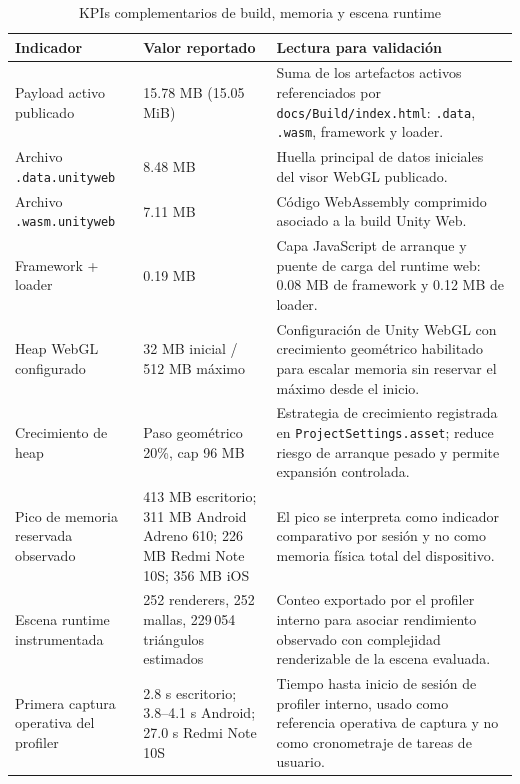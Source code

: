 \begin{table}[H]
    \caption{KPIs complementarios de build, memoria y escena runtime}
    \label{tab:kpis_complementarios_build_memoria}
    \centering
    \scriptsize
    \singlespacing
    \renewcommand{\arraystretch}{1.08}
    \setlength{\tabcolsep}{3pt}
    \begin{tabular}{p{3.8cm}p{3.2cm}p{7.0cm}}
        \hline
        \textbf{Indicador} & \textbf{Valor reportado} & \textbf{Lectura para validación} \\ \hline
        Payload activo publicado & 15.78 MB (15.05 MiB) & Suma de los artefactos activos referenciados por \texttt{docs/Build/index.html}: \texttt{.data}, \texttt{.wasm}, framework y loader. \\
        Archivo \texttt{.data.unityweb} & 8.48 MB & Huella principal de datos iniciales del visor WebGL publicado. \\
        Archivo \texttt{.wasm.unityweb} & 7.11 MB & Código WebAssembly comprimido asociado a la build Unity Web. \\
        Framework + loader & 0.19 MB & Capa JavaScript de arranque y puente de carga del runtime web: 0.08 MB de framework y 0.12 MB de loader. \\
        Heap WebGL configurado & 32 MB inicial / 512 MB máximo & Configuración de Unity WebGL con crecimiento geométrico habilitado para escalar memoria sin reservar el máximo desde el inicio. \\
        Crecimiento de heap & Paso geométrico 20\%, cap 96 MB & Estrategia de crecimiento registrada en \texttt{ProjectSettings.asset}; reduce riesgo de arranque pesado y permite expansión controlada. \\
        Pico de memoria reservada observado & 413 MB escritorio; 311 MB Android Adreno 610; 226 MB Redmi Note 10S; 356 MB iOS & El pico se interpreta como indicador comparativo por sesión y no como memoria física total del dispositivo. \\
        Escena runtime instrumentada & 252 renderers, 252 mallas, 229\,054 triángulos estimados & Conteo exportado por el profiler interno para asociar rendimiento observado con complejidad renderizable de la escena evaluada. \\
        Primera captura operativa del profiler & 2.8 s escritorio; 3.8--4.1 s Android; 27.0 s Redmi Note 10S & Tiempo hasta inicio de sesión de profiler interno, usado como referencia operativa de captura y no como cronometraje de tareas de usuario. \\ \hline

\end{tabular}
\end{table}
